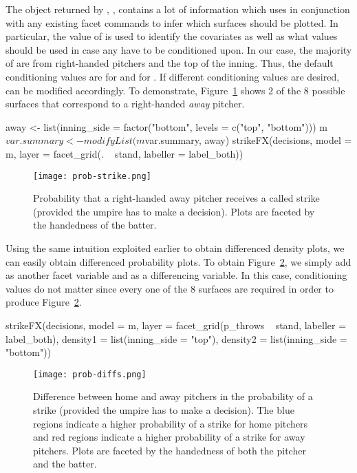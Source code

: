 \begin{article}
The object returned by , , contains a lot of
information which  uses in conjunction with any
existing facet commands to infer which surfaces should be plotted. In
particular, the  value of  is used to
identify the covariates as well as what values should be used in case
any have to be conditioned upon. In our case, the majority of
 are from right-handed pitchers and the top of the
inning. Thus, the default conditioning values are  for
 and  for .  If different
conditioning values are desired,  can be modified
accordingly. To demonstrate, Figure~\ref{fig:strike-probs} shows 2 of
the 8 possible surfaces that correspond to a right-handed \emph{away}
pitcher.
%
\begin{Schunk}
\begin{Sinput}
away <- list(inning_side = factor("bottom", levels = c("top", "bottom")))
m$var.summary <- modifyList(m$var.summary, away)
strikeFX(decisions, model = m, layer = facet_grid(. ~ stand, labeller = label_both))
\end{Sinput}
\end{Schunk}

\begin{figure}[h]
\centerline{\texttt{[image: prob-strike.png]}}
\caption{\label{fig:strike-probs}Probability that a right-handed away pitcher
receives a called strike (provided the umpire has to make a decision).
Plots are faceted by the handedness of the batter.}
\end{figure}

Using the same intuition exploited earlier to obtain differenced density
plots, we can easily obtain differenced probability plots. To obtain
Figure~\ref{fig:diff-probs}, we simply add  as another
facet variable and  as a differencing variable.
In this case, conditioning values do not matter since every one of
the 8 surfaces are required in order to produce Figure~\ref{fig:diff-probs}.
%
\begin{Schunk}
\begin{Sinput}
strikeFX(decisions, model = m, layer = facet_grid(p_throws ~ stand, 
  labeller = label_both), density1 = list(inning_side = "top"), 
  density2 = list(inning_side = "bottom"))
\end{Sinput}
\end{Schunk}

\begin{figure}[h]
\centerline{\texttt{[image: prob-diffs.png]}}
\caption{\label{fig:diff-probs}Difference between home and away pitchers in
the probability of a strike (provided the umpire has to make a decision).
The blue regions indicate a higher probability of a strike for home
pitchers and red regions indicate a higher probability of a strike
for away pitchers. Plots are faceted by the handedness of both the
pitcher and the batter.}
\end{figure}


\end{article}
